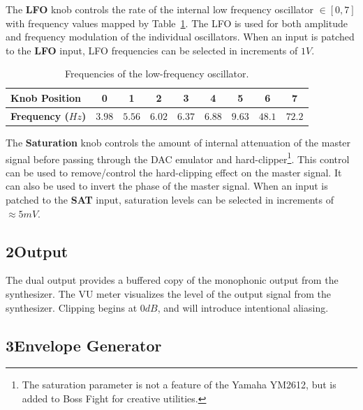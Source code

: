 \documentclass[12pt,letter]{article}
\begin{document}
The \textbf{LFO} knob controls the rate of the internal low frequency oscillator $\in [0, 7]$ with frequency values mapped by Table~\ref{tab:lfo-frequencies}. The LFO is used for both amplitude and frequency modulation of the individual oscillators. When an input is patched to the \textbf{LFO} input, LFO frequencies can be selected in increments of $1V$.

\begin{table}[!htp]
\centering
\caption{Frequencies of the low-frequency oscillator.}
\label{tab:lfo-frequencies}
\begin{tabular}{|l|c|c|c|c|c|c|c|c|}
\hline
\bfseries Knob Position    & 0      & 1      & 2      & 3      & 4      & 5      & 6      & 7      \\
\hline
\bfseries Frequency ($Hz$) & $3.98$ & $5.56$ & $6.02$ & $6.37$ & $6.88$ & $9.63$ & $48.1$ & $72.2$ \\
\hline
\end{tabular}
\end{table}

The \textbf{Saturation} knob controls the amount of internal attenuation of the master signal before passing through the DAC emulator and hard-clipper\footnote{The saturation parameter is not a feature of the Yamaha YM2612, but is added to Boss Fight for creative utilities.}. This control can be used to remove/control the hard-clipping effect on the master signal. It can also be used to invert the phase of the master signal. When an input is patched to the \textbf{SAT} input, saturation levels can be selected in increments of $\approx5mV$.

\subsection*{2{\quad}Output}

The dual output provides a buffered copy of the monophonic output from the synthesizer. The VU meter visualizes the level of the output signal from the synthesizer. Clipping begins at $0dB$, and will introduce intentional aliasing.

\subsection*{3{\quad}Envelope Generator}
\end{document}
